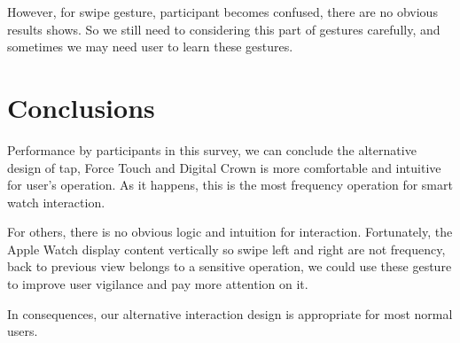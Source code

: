 However, for swipe gesture, participant becomes confused, there are no obvious results shows. So we still need to considering this part of gestures carefully, and sometimes we may need user to learn these gestures.

\section{Conclusions}

Performance by participants in this survey, we can conclude the alternative design of tap, Force Touch and Digital Crown is more comfortable and intuitive for user's operation. As it happens, this is the most frequency operation for smart watch interaction.

For others, there is no obvious logic and intuition for interaction. Fortunately, the Apple Watch display content vertically so swipe left and right are not frequency, back to previous view belongs to a sensitive operation, we could use these gesture to improve user vigilance and pay more attention on it.

In consequences, our alternative interaction design is appropriate for most normal users.

\cleardoublepage
